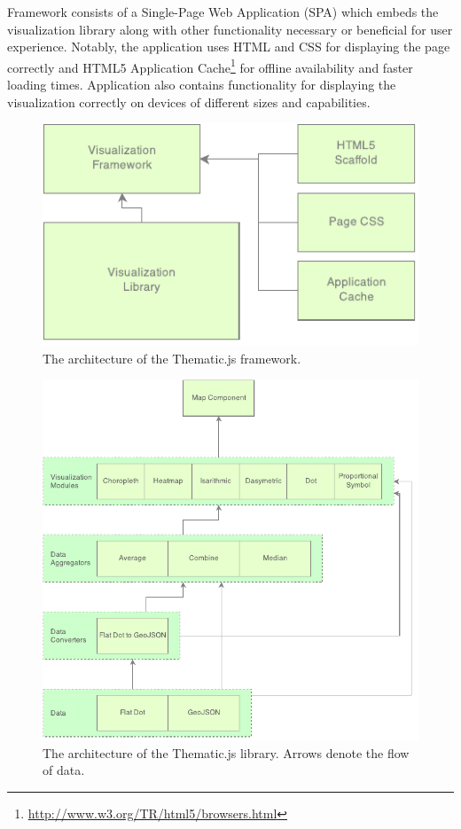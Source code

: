 Framework consists of a Single-Page Web Application (SPA) which embeds the visualization library along with other functionality necessary or beneficial for user experience. Notably, the application uses HTML and CSS for displaying the page correctly and HTML5 Application Cache\footnote{\url{http://www.w3.org/TR/html5/browsers.html}} for offline availability and faster loading times. Application also contains functionality for displaying the visualization correctly on devices of different sizes and capabilities.

\begin{figure}[htbp]
  \centering
  \includegraphics[width=\textwidth]{images/framework-architecture.pdf}
  \caption{The architecture of the Thematic.js framework.}
  \label{fig:framework_architecture}
\end{figure}

\begin{figure}[htbp]
  \centering
  \includegraphics[width=\textwidth]{images/library-architecture.pdf}
  \caption{The architecture of the Thematic.js library. Arrows denote the flow of data.}
  \label{fig:lib_architecture}
\end{figure}

